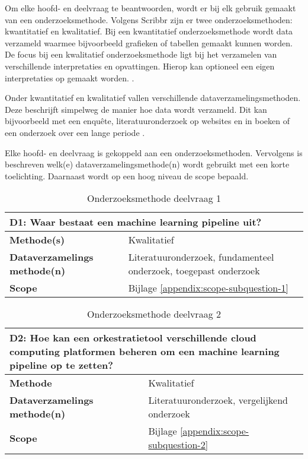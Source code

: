 
\renewcommand{\arraystretch}{1.35} %

Om elke hoofd- en deelvraag te beantwoorden, wordt er bij elk gebruik gemaakt van een onderzoeksmethode. Volgens Scribbr \cite{research-methods} zijn er twee onderzoeksmethoden: kwantitatief en kwalitatief. Bij een kwantitatief onderzoeksmethode wordt data verzameld waarmee bijvoorbeeld grafieken of tabellen gemaakt kunnen worden. De focus bij een kwalitatief onderzoeksmethode ligt bij het verzamelen van verschillende interpretaties en opvattingen. Hierop kan optioneel een eigen interpretaties op gemaakt worden. \cite{quantitative-vs-qualitative}.

Onder kwantitatief en kwalitatief vallen verschillende dataverzamelingsmethoden. Deze beschrijft simpelweg de manier hoe data wordt verzameld. Dit kan bijvoorbeeld met een enquête, literatuuronderzoek op websites en in boeken of een onderzoek over een lange periode \cite{quantitative-vs-qualitative}.

Elke hoofd- en deelvraag is gekoppeld aan een onderzoeksmethoden. Vervolgens is beschreven welk(e) dataverzamelingsmethode(n) wordt gebruikt met een korte toelichting. Daarnaast wordt op een hoog niveau de scope bepaald.

\begin{table}[hbt!]
  \centering
  \begin{tabular}{|p{.215\linewidth}|p{.72\linewidth}|}
  \hline
  \multicolumn{2}{|p{.97\linewidth}|}{\textbf{D1: Waar bestaat een machine learning pipeline uit?}} \\ \hline
    \textbf{Methode(s)}&
      Kwalitatief
    \\ \hline
    \textbf{Dataverzamelings methode(n)}&
      Literatuuronderzoek, fundamenteel onderzoek, toegepast onderzoek
    \\ \hline
    \textbf{Scope}&
      Bijlage \ref{appendix:scope-subquestion-1}
    \\ \hline
  \end{tabular}
  \caption{Onderzoeksmethode deelvraag 1}
  \label{table:research-method-subquestion-1}
\end{table}

\begin{table}[hbt!]
  \centering
  \begin{tabular}{|p{.215\linewidth}|p{.72\linewidth}|}
  \hline
  \multicolumn{2}{|p{.97\linewidth}|}{\textbf{D2: Hoe kan een orkestratietool verschillende cloud computing platformen beheren om een machine learning pipeline op te zetten?}} \\ \hline
    \textbf{Methode}&
      Kwalitatief
    \\ \hline
    \textbf{Dataverzamelings methode(n)}&
      Literatuuronderzoek, vergelijkend onderzoek
    \\ \hline
    \textbf{Scope}&
      Bijlage \ref{appendix:scope-subquestion-2}
    \\ \hline
  \end{tabular}
  \caption{Onderzoeksmethode deelvraag 2}
  \label{table:sq2}
\end{table}

